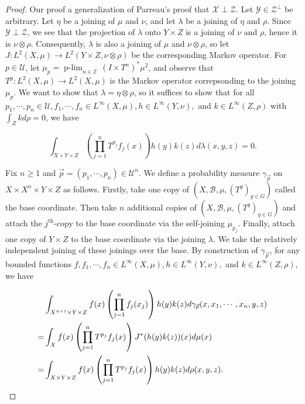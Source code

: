 \documentclass[graybox]{svmult}
\theoremstyle{definition}
\newcommand{\Z}{\mathbb{Z}}
\newcommand{\plimgG}[3]{\mathop {#1\text{-lim}}_{#2\in #3}\,}
\begin{document}
\begin{proof}
    Our proof a generalization of Parreau's proof \cite{ParreauFactor} that $\mathcal{X}\perp\mathcal{Z}$.
    Let $\mathcal{Y} \in \mathcal{Z}^\perp$ be arbitrary.
    Let $\eta$ be a joining of $\mu$ and $\nu$, and let $\lambda$ be a joining of $\eta$ and $\rho$.
    Since $\mathcal{Y}\perp\mathcal{Z}$, we see that the projection of $\lambda$ onto $Y\times Z$ is a joining of $\nu$ and $\rho$, hence it is $\nu\otimes\rho$.
    Consequently, $\lambda$ is also a joining of $\mu$ and $\nu\otimes\rho$, so let $J:L^2(X,\mu)\rightarrow L^2(Y\times Z,\nu\otimes\rho)$ be the corresponding Markov operator.
    For $p \in \mathcal{U}$, let $\mu_p = \plimgG{p}{n}{\Z}(I\times T^n)^*\mu^2$, and observe that $T^p:L^2(X,\mu)\rightarrow L^2(X,\mu)$ is the Markov operator correpsonding to the joining $\mu_p$.
    We want to show that $\lambda = \eta\otimes\rho$, so it suffices to show that for all $p_1,\cdots,p_n \in \mathcal{U}, f_1,\cdots,f_n \in L^\infty(X,\mu), h \in L^\infty(Y,\nu),$ and $k \in L^\infty(Z,\rho)$ with $\int_Zkd\rho = 0$, we have

    \begin{equation}\label{eq:MultiplierDisjointnessGoal}
        \int_{X\times Y\times Z}\left(\prod_{j = 1}^nT^{p_j}f_j(x)\right)h(y)k(z)d\lambda(x,y,z) = 0.
    \end{equation}

    Fix $n \ge 1$ and $\vec{p} = (p_1,\cdots,p_n) \in \mathcal{U}^n$.
    We define a probability measure $\gamma_{\vec{p}}$ on $X\times X^n\times Y\times Z$ as follows.
    Firstly, take one copy of $(X,\mathscr{B},\mu,(T^g)_{g \in G})$ called the base coordinate.
    Then take $n$ additional copies of $(X,\mathscr{B},\mu,(T^g)_{g \in G})$ and attach the $j^{\text{th}}$-copy to the base coordinate via the self-joining $\mu_{p_j}$.
    Finally, attach one copy of $Y\times Z$ to the base coordinate via the joining $\lambda$.
    We take the relatively independent joining of these joinings over the base.
    By construction of $\gamma_{\vec{p}}$, for any bounded functions $f,f_1,\cdots,f_n \in L^\infty(X,\mu), h \in L^\infty(Y,\nu),$ and $k \in L^\infty(Z,\rho)$, we have

    \begin{alignat}{2}
        &\int_{X^{n+1}\times Y\times Z}f(x)\left(\prod_{j = 1}^nf_j(x_j)\right)h(y)k(z)d\gamma_{{\vec p}}(x,x_1,\cdots,x_n,y,z)\label{eq:RelIndJoining}\\
        =&\int_{X}f(x)\left(\prod_{j = 1}^nT^{p_j}f_j(x)\right)J^*(h(y)k(z))(x)d\mu(x)\notag\\
        =&\int_{X\times Y\times Z}f(x)\left(\prod_{j = 1}^nT^{p_j}f_j(x)\right)h(y)k(z)d\rho(x,y,z).\notag      
    \end{alignat}


\end{proof}
\end{document}
